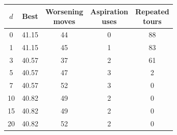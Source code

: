 \begin{tabular}{ccccc}
\toprule
$d$ & Best & \makecell{Worsening\\moves} & \makecell{Aspiration\\uses} & \makecell{Repeated\\tours} \\
\midrule
0 & 41.15 & 44 & 0 & 88 \\
1 & 41.15 & 45 & 1 & 83 \\
3 & 40.57 & 37 & 2 & 61 \\
5 & 40.57 & 47 & 3 & 2 \\
7 & 40.57 & 52 & 3 & 0 \\
10 & 40.82 & 49 & 2 & 0 \\
15 & 40.82 & 49 & 2 & 0 \\
20 & 40.82 & 52 & 2 & 0 \\
\bottomrule
\end{tabular}
